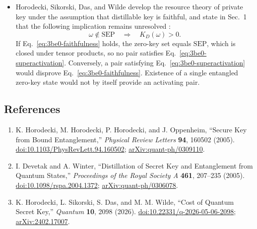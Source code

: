 \begin{itemize}
  \item Horodecki, Sikorski, Das, and Wilde develop the resource theory of
  private key under the assumption that distillable key is faithful, and
  state in Sec.~1 that the following implication remains unresolved
  :
  \begin{equation}
    \omega\notin\mathrm{SEP}\quad\Longrightarrow\quad K_D(\omega)>0.
    \label{eq:3be0-faithfulness}
  \end{equation}
  If
  Eq.~\eqref{eq:3be0-faithfulness} holds, the zero-key set equals
  $\mathrm{SEP}$, which is closed under tensor products, so no pair satisfies
  Eq.~\eqref{eq:3be0-superactivation}.  Conversely, a pair satisfying
  Eq.~\eqref{eq:3be0-superactivation} would disprove
  Eq.~\eqref{eq:3be0-faithfulness}.  Existence of a single entangled zero-key
  state would not by itself provide an activating pair.
\end{itemize}

\subsection*{References}

\begin{enumerate}[label={},leftmargin=4.8em,labelsep=0.5em]
  \footnotesize
  \item[\textup{[HHHO05]}]\label{ref:3be0-hhho}
  K. Horodecki, M. Horodecki, P. Horodecki, and J. Oppenheim,
  ``Secure Key from Bound Entanglement,''
  \emph{Physical Review Letters} \textbf{94}, 160502 (2005).
  \href{https://doi.org/10.1103/PhysRevLett.94.160502}{doi:10.1103/PhysRevLett.94.160502};
  \href{https://arxiv.org/abs/quant-ph/0309110}{arXiv:quant-ph/0309110}.

  \item[\textup{[DW05]}]\label{ref:3be0-dw}
  I. Devetak and A. Winter, ``Distillation of Secret Key and Entanglement
  from Quantum States,'' \emph{Proceedings of the Royal Society A}
  \textbf{461}, 207--235 (2005).
  \href{https://doi.org/10.1098/rspa.2004.1372}{doi:10.1098/rspa.2004.1372};
  \href{https://arxiv.org/abs/quant-ph/0306078}{arXiv:quant-ph/0306078}.

  \item[\textup{[HSDW26]}]\label{ref:3be0-hsdw}
  K. Horodecki, L. Sikorski, S. Das, and M. M. Wilde,
  ``Cost of Quantum Secret Key,'' \emph{Quantum} \textbf{10}, 2098 (2026).
  \href{https://doi.org/10.22331/q-2026-05-06-2098}{doi:10.22331/q-2026-05-06-2098};
  \href{https://arxiv.org/abs/2402.17007}{arXiv:2402.17007}.
\end{enumerate}

